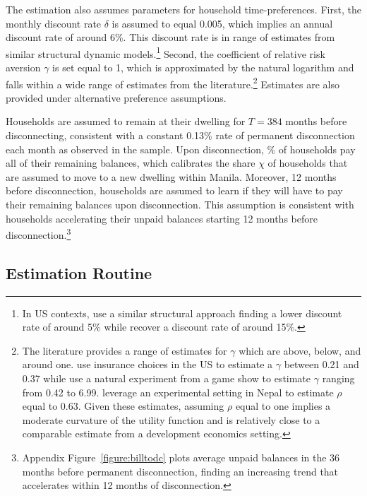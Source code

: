 \documentclass[12pt,table]{article}
\begin{document}
The estimation also assumes parameters for household time-preferences.  First, the monthly discount rate $\delta$ is assumed to equal 0.005, which implies an annual discount rate of around 6\%. This discount rate is in range of estimates from similar structural dynamic models.\footnote{In US contexts, \cite{gourinchas2002consumption} use a similar structural approach finding a lower discount rate of around 5\% while \cite{laibson2007estimating} recover a discount rate of around 15\%.}  Second, the coefficient of relative risk aversion $\gamma$ is set equal to 1, which is approximated by the natural logarithm and falls within a wide range of estimates from the literature.\footnote{The literature provides a range of estimates for $\gamma$ which are above, below, and around one.  \cite{barseghyan2013nature} use insurance choices in the US to estimate a $\gamma$ between 0.21 and 0.37 while  \cite{beetsma2001measuring} use a natural experiment from a game show to estimate $\gamma$ ranging from 0.42 to 6.99.  \cite{carvalho2016effect} leverage an experimental setting in Nepal to estimate $\rho$ equal to 0.63.  Given these estimates, assuming $\rho$ equal to one implies a moderate curvature of the utility function and is relatively close to a comparable estimate from a development economics setting.}  Estimates are also provided under alternative preference assumptions.

Households are assumed to remain at their dwelling for $T=384$ months before disconnecting, consistent with a constant 0.13\% rate of permanent disconnection each month as observed in the sample.  Upon disconnection, \unskip\% of households pay all of their remaining balances, which calibrates the share $\chi$ of households that are assumed to move to a new dwelling within Manila.  Moreover, 12 months before disconnection, households are assumed to learn if they will have to pay their remaining balances upon disconnection.  This assumption is consistent with households accelerating their unpaid balances starting 12 months before disconnection.\footnote{Appendix Figure~\ref{figure:billtodc} plots average unpaid balances in the 36 months before permanent disconnection, finding an increasing trend that accelerates within 12 months of disconnection.}

\subsection{Estimation Routine}
\end{document}
